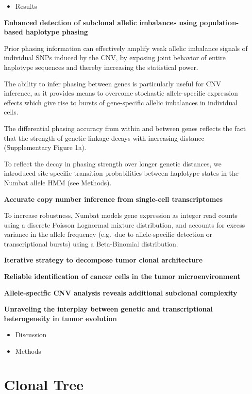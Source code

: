 \documentclass[
]{book}
\providecommand{\tightlist}{%
  \setlength{\itemsep}{0pt}\setlength{\parskip}{0pt}}
\begin{document}
\begin{itemize}
\tightlist
\item
  Results
\end{itemize}

\textbf{Enhanced detection of subclonal allelic imbalances using population-based haplotype phasing}

Prior phasing information can effectively amplify weak allelic imbalance signals of individual SNPs induced by the CNV, by exposing joint behavior of entire haplotype sequences and thereby increasing the statistical power.

The ability to infer phasing between genes is particularly useful for CNV inference, as it provides means to overcome stochastic allele-specific expression effects which give rise to bursts of gene-specific allelic imbalances in individual cells.

The differential phasing accuracy from within and between genes reflects the fact that the strength of genetic linkage decays with increasing distance (Supplementary Figure 1a).

To reflect the decay in phasing strength over longer genetic distances, we introduced site-specific transition probabilities between haplotype states in the Numbat allele HMM (see Methods).

\textbf{Accurate copy number inference from single-cell transcriptomes}

To increase robustness, Numbat models gene expression as integer read counts using a discrete Poisson Lognormal mixture distribution, and accounts for excess variance in the allele frequency (e.g.~due to allele-specific detection or transcriptional bursts) using a Beta-Binomial distribution.

\textbf{Iterative strategy to decompose tumor clonal architecture}

\textbf{Reliable identification of cancer cells in the tumor microenvironment}

\textbf{Allele-specific CNV analysis reveals additional subclonal complexity}

\textbf{Unraveling the interplay between genetic and transcriptional heterogeneity in tumor evolution}

\begin{itemize}
\item
  Discussion
\item
  Methods
\end{itemize}

\hypertarget{clonal-tree}{%
\section{Clonal Tree}\label{clonal-tree}}
\end{document}
